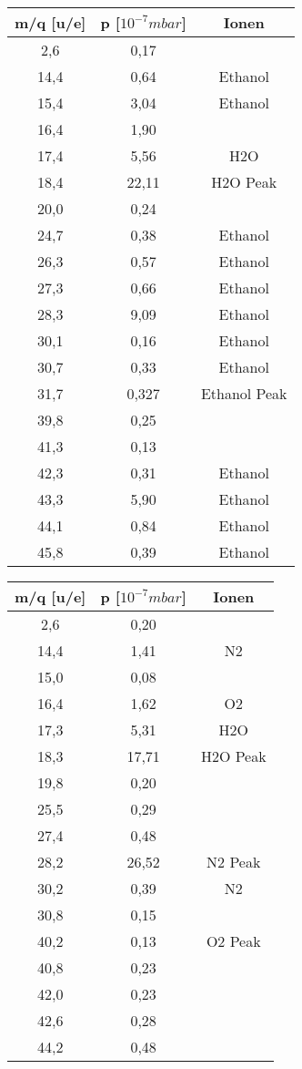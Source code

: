 \begin{center}
\begin{tabular}{c|c|c}
m/q [u/e] & p [$10^{-7} mbar$] & Ionen\\	
\hline	
2,6 &	0,17 &\\
14,4 &	0,64 & Ethanol\\
15,4 &	3,04 & Ethanol\\
16,4 &	1,90 &\\
17,4 &	5,56 & H2O\\
18,4 &	22,11 & H2O Peak\\
20,0 &	0,24 &\\
24,7 &	0,38 & Ethanol\\
26,3 &	0,57 & Ethanol\\
27,3 &	0,66 & Ethanol\\
28,3 &	9,09 & Ethanol\\
30,1 &	0,16 & Ethanol\\
30,7 &	0,33 & Ethanol\\
31,7 &	0,327 & Ethanol Peak\\
39,8 &	0,25 &\\
41,3 &	0,13 &\\
42,3 &	0,31 & Ethanol\\
43,3 &	5,90 & Ethanol\\
44,1 &	0,84 & Ethanol\\
45,8 &	0,39 & Ethanol\\
\end{tabular}
\end{center}


\begin{center}
\begin{tabular}{c|c|c}
m/q [u/e] & p [$10^{-7} mbar$] & Ionen\\	
\hline	
2,6 &	0,20 &\\
14,4 &	1,41 & N2\\
15,0 &	0,08 &\\
16,4 &	1,62 & O2\\
17,3 &	5,31 & H2O\\
18,3 &	17,71 & H2O Peak\\
19,8 &	0,20 &\\
25,5 &	0,29 &\\
27,4 &	0,48 &\\
28,2 &	26,52 & N2 Peak\\
30,2 &	0,39 & N2\\
30,8 &	0,15 &\\
40,2 &	0,13 & O2 Peak\\
40,8 &	0,23 &\\
42,0 &	0,23 &\\
42,6 &	0,28 &\\
44,2 &	0,48 &\\
\end{tabular}
\end{center}
